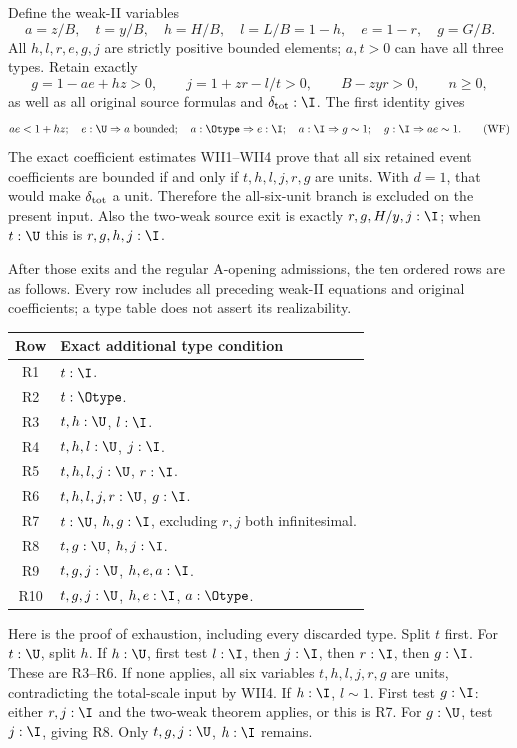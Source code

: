 Define the weak-II variables
\[
a=z/B,\quad t=y/B,\quad h=H/B,\quad l=L/B=1-h,
\quad e=1-r,\quad g=G/B.
\]
All $h,l,r,e,g,j$ are strictly positive bounded elements; $a,t>0$ can
have all three types. Retain exactly
\[
g=1-ae+hz>0,\qquad j=1+zr-l/t>0,\qquad B-zyr>0,
\qquad n\ge0,
\]
as well as all original source formulas and $\delta_{\rm tot}:\I$.
The first identity gives
\[
ae<1+hz;\quad e:\U\Rightarrow a\text{ bounded};\quad
a:\Otype\Rightarrow e:\I;\quad a:\I\Rightarrow g\sim1;
\quad g:\I\Rightarrow ae\sim1. \tag{WF}
\]
The exact coefficient estimates WII1--WII4 prove that all six retained
event coefficients are bounded if and only if
$t,h,l,j,r,g$ are units. With $d=1$, that would make
$\delta_{\rm tot}$ a unit. Therefore the all-six-unit branch is
excluded on the present input. Also the two-weak source exit is exactly
$r,g,H/y,j:\I$; when $t:\U$ this is $r,g,h,j:\I$.

After those exits and the regular A-opening admissions, the ten ordered
rows are as follows. Every row includes all preceding weak-II equations
and original coefficients; a type table does not assert its realizability.
\begin{longtable}{c p{.78\linewidth}}
\toprule Row & Exact additional type condition \\\midrule
R1 & $t:\I$.\\
R2 & $t:\Otype$.\\
R3 & $t,h:\U$, $l:\I$.\\
R4 & $t,h,l:\U$, $j:\I$.\\
R5 & $t,h,l,j:\U$, $r:\I$.\\
R6 & $t,h,l,j,r:\U$, $g:\I$.\\
R7 & $t:\U$, $h,g:\I$, excluding $r,j$ both infinitesimal.\\
R8 & $t,g:\U$, $h,j:\I$.\\
R9 & $t,g,j:\U$, $h,e,a:\I$.\\
R10 & $t,g,j:\U$, $h,e:\I$, $a:\Otype$.\\
\bottomrule
\end{longtable}

Here is the proof of exhaustion, including every discarded type.
Split $t$ first. For $t:\U$, split $h$. If $h:\U$, first test
$l:\I$, then $j:\I$, then $r:\I$, then $g:\I$. These are R3--R6.
If none applies, all six variables $t,h,l,j,r,g$ are units, contradicting
the total-scale input by WII4. If $h:\I$, $l\sim1$. First test
$g:\I$: either $r,j:\I$ and the two-weak theorem applies, or this is
R7. For $g:\U$, test $j:\I$, giving R8. Only
$t,g,j:\U$, $h:\I$ remains.

